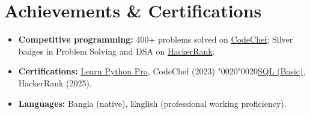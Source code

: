 \documentclass[10pt,a4paper]{article}
\newcommand{\realspace}{\XeTeXglyph\XeTeXcharglyph"0020\relax}
\newcommand{\psep}{\realspace\textbar\realspace}
\begin{document}
\section*{Achievements \& Certifications}
\begin{itemize}
  \item \textbf{Competitive programming:} 400+ problems solved on \href{https://www.codechef.com/users/shahriar42}{CodeChef}; Silver badges in Problem Solving and DSA on \href{https://www.hackerrank.com/profile/shahriarkabir_20}{HackerRank}.
  \item \textbf{Certifications:} \href{https://www.codechef.com/certificates/public/a367201}{Learn Python Pro}, CodeChef (2023) \psep \href{https://www.hackerrank.com/certificates/6d1cdc7ba513}{SQL (Basic)}, HackerRank (2025).
  \item \textbf{Languages:} Bangla (native), English (professional working proficiency).
\end{itemize}
\end{document}
